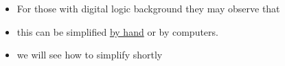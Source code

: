 \begin{frame}[label=handout, fragile]
\begin{tcolorbox}
\end{tcolorbox}   

\BNotes\ifnum{}
\begin{itemize}
    \item For those with digital logic background they may observe that 
    \item this can be simplified  \underline{by hand} or by computers.
    \item we will see how to simplify shortly 
\end{itemize}
\fi\ENotes
\end{frame}
\fi



